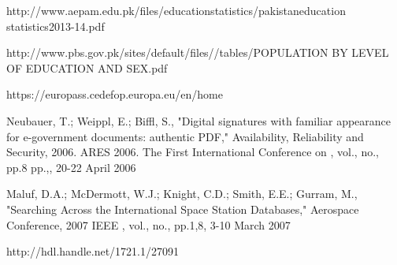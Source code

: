 \documentclass[12pt,a4paper,oneside]{book}
\begin{document}
\begin{thebibliography}{10}
http://www.aepam.edu.pk/files/educationstatistics/pakistaneducation
statistics2013-14.pdf

http://www.pbs.gov.pk/sites/default/files//tables/POPULATION BY LEVEL OF EDUCATION AND SEX.pdf

https://europass.cedefop.europa.eu/en/home

Neubauer, T.; Weippl, E.; Biffl, S., "Digital signatures with familiar appearance for e-government documents: authentic PDF," Availability, Reliability and Security, 2006. ARES 2006. The First International Conference on , vol., no., pp.8 pp.,, 20-22 April 2006

Maluf, D.A.; McDermott, W.J.; Knight, C.D.; Smith, E.E.; Gurram, M., "Searching Across the International Space Station Databases," Aerospace Conference, 2007 IEEE , vol., no., pp.1,8, 3-10 March 2007

http://hdl.handle.net/1721.1/27091


\end{thebibliography}
\end{document}
